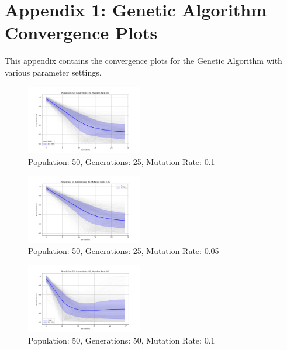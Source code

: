 \documentclass[
]{article}
\begin{document}
    \newpage
    \appendix


    \section{Appendix 1: Genetic Algorithm Convergence Plots}

    This appendix contains the convergence plots for the Genetic Algorithm with various parameter settings.

    \begin{figure}[H]
        \centering
        \includegraphics[width=0.45\textwidth]{genetic_algorithm/appendix/Population_50_Generations_25_MutationRate_0.1}
        \caption{Population: 50, Generations: 25, Mutation Rate: 0.1}
        \label{fig:app_ga_50_25_1}
    \end{figure}

    \begin{figure}[H]
        \centering
        \includegraphics[width=0.45\textwidth]{genetic_algorithm/appendix/Population_50_Generations_25_MutationRate_0.05}
        \caption{Population: 50, Generations: 25, Mutation Rate: 0.05}
        \label{fig:app_ga_50_25_05}
    \end{figure}

    \begin{figure}[H]
        \centering
        \includegraphics[width=0.45\textwidth]{genetic_algorithm/appendix/Population_50_Generations_50_MutationRate_0.1}
        \caption{Population: 50, Generations: 50, Mutation Rate: 0.1}
        \label{fig:app_ga_50_50_1}
    \end{figure}
\end{document}
